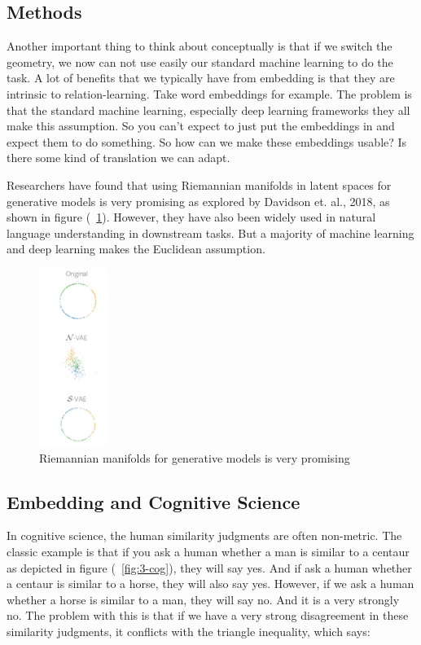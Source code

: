 \subsection{Methods}

Another important thing to think about conceptually is that if we switch the geometry, we now can not use easily our standard machine learning to do the task. A lot of benefits that we typically have from embedding is that they are intrinsic to relation-learning. Take word embeddings for example. The problem is that the standard machine learning, especially deep learning frameworks they all make this assumption. So you can't expect to just put the embeddings in and expect them to do something. So how can we make these embeddings usable? Is there some kind of translation we can adapt.

Researchers have found that using Riemannian manifolds in latent spaces for generative models is very promising as explored by Davidson et. al., 2018, as shown in figure (~\ref{fig:2-Davidson}). However, they have also been widely used in natural language understanding in downstream tasks. But a majority of machine learning and deep learning makes the Euclidean assumption.

\begin{figure}[htb]
  \centering
    \includegraphics[width=0.2\textwidth]{figs/2-Davidson.png}
    \caption{Riemannian manifolds for generative models is very promising}
    \label{fig:2-Davidson}
\end{figure}

\subsection{Embedding and Cognitive Science}

In cognitive science, the human similarity judgments are often non-metric. The classic example is that if you ask a human whether a man is similar to a centaur as depicted in figure (~\ref{fig:3-cog}), they will say yes. And if ask a human whether a centaur is similar to a horse, they will also say yes. However, if we ask a human whether a horse is similar to a man, they will say no. And it is a very strongly no. The problem with this is that if we have a very strong disagreement in these similarity judgments, it conflicts with the triangle inequality, which says: 

